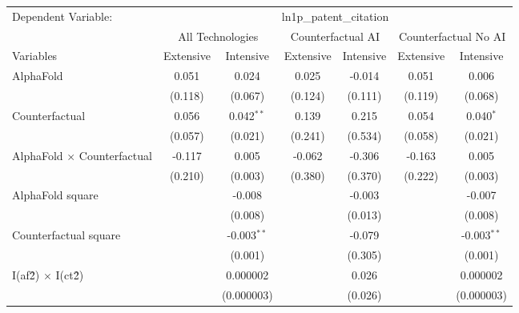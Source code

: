 \begingroup
\centering
\begin{tabular}{lcccccc}
   \tabularnewline \midrule \midrule
   Dependent Variable: & \multicolumn{6}{c}{ln1p\_patent\_citation}\\
 & \multicolumn{2}{c}{All Technologies} & \multicolumn{2}{c}{Counterfactual AI} & \multicolumn{2}{c}{Counterfactual No AI} \\
\cmidrule(lr){1-1}\cmidrule(lr){2-3} \cmidrule(lr){4-5} \cmidrule(lr){6-7}
Variables & \multicolumn{1}{c}{Extensive} & \multicolumn{1}{c}{Intensive} & \multicolumn{1}{c}{Extensive} & \multicolumn{1}{c}{Intensive} & \multicolumn{1}{c}{Extensive} & \multicolumn{1}{c}{Intensive} \\
\cmidrule(lr){1-1}\cmidrule(lr){2-2} \cmidrule(lr){3-3} \cmidrule(lr){4-4} \cmidrule(lr){5-5} \cmidrule(lr){6-6} \cmidrule(lr){7-7}
   AlphaFold                          & 0.051   & 0.024         & 0.025   & -0.014  & 0.051   & 0.006\\   
                                      & (0.118) & (0.067)       & (0.124) & (0.111) & (0.119) & (0.068)\\   
   Counterfactual                     & 0.056   & 0.042$^{**}$  & 0.139   & 0.215   & 0.054   & 0.040$^{*}$\\   
                                      & (0.057) & (0.021)       & (0.241) & (0.534) & (0.058) & (0.021)\\   
   AlphaFold $\times$ Counterfactual  & -0.117  & 0.005         & -0.062  & -0.306  & -0.163  & 0.005\\   
                                      & (0.210) & (0.003)       & (0.380) & (0.370) & (0.222) & (0.003)\\   
   AlphaFold square                   &         & -0.008        &         & -0.003  &         & -0.007\\   
                                      &         & (0.008)       &         & (0.013) &         & (0.008)\\   
   Counterfactual square              &         & -0.003$^{**}$ &         & -0.079  &         & -0.003$^{**}$\\   
                                      &         & (0.001)       &         & (0.305) &         & (0.001)\\   
   I(af\^2) $\times$ I(ct\^2)         &         & 0.000002      &         & 0.026   &         & 0.000002\\   
                                      &         & (0.000003)    &         & (0.026) &         & (0.000003)\\   

\end{tabular}

